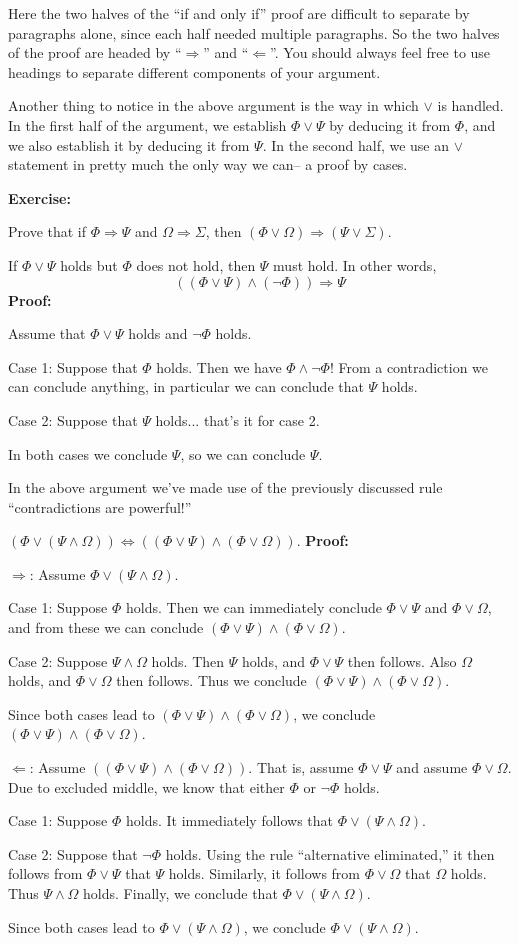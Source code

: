 \documentclass[12pt]{article}
\newcommand{\AND}{\wedge}
\newcommand{\OR}{\vee}
\newcommand{\ARR}{\Rightarrow}
\newcommand{\DARR}{\Leftrightarrow}
\newcommand{\ex}[1]{\textbf{Exercise:}\begin{adjustwidth}{2em}{}#1\end{adjustwidth}}
\newcommand{\DRULEPF}[3]{\begin{tcolorbox}[title=Derived Rule: #1,colbacktitle=white,coltitle=black,colback=white] {#2} \tcblower \textbf{Proof:} {#3} \end{tcolorbox}}
\def\pA{\Phi}
\def\pB{\Psi}
\def\pC{\Omega}
\def\pD{\Sigma}
\begin{document}
Here the two halves of the ``if and only if'' proof are difficult to separate by paragraphs alone, since each half needed multiple paragraphs.
So the two halves of the proof are headed by ``$\Rightarrow$'' and ``$\Leftarrow$''.
You should always feel free to use headings to separate different components of your argument.

Another thing to notice in the above argument is the way in which $\OR$ is handled.
In the first half of the argument, we establish $\pA\OR\pB$ by deducing it from $\pA$, and we also establish it by deducing it from $\pB$.
In the second half, we use an $\OR$ statement in pretty much the only way we can-- a proof by cases.

\ex{Prove that if $\pA\ARR\pB$ and $\pC\ARR\pD$, then $(\pA\OR\pC)\ARR(\pB\OR\pD)$.}

\DRULEPF{Alternative Eliminated}{
If $\pA\OR\pB$ holds but $\pA$ does not hold, then $\pB$ must hold.
In other words,
$$((\pA\OR\pB)\AND(\neg\pA))\ARR\pB$$
}{
Assume that $\pA\OR\pB$ holds and $\neg\pA$ holds.
\lsp

Case 1: Suppose that $\pA$ holds.
Then we have $\pA\AND\neg\pA$! From a contradiction we can conclude anything, in particular we can conclude that $\pB$ holds.
\lsp

Case 2: Suppose that $\pB$ holds... that's it for case 2.
\lsp

In both cases we conclude $\pB$, so we can conclude $\pB$.
}

In the above argument we've made use of the previously discussed rule ``contradictions are powerful!''


\DRULEPF{Or Distributes over And}{
$(\pA\OR(\pB\AND\pC))\DARR((\pA\OR\pB)\AND(\pA\OR\pC))$.
}{
$\Rightarrow$:
Assume $\pA\OR(\pB\AND\pC)$.
\lsp

Case 1: Suppose $\pA$ holds. Then we can immediately conclude $\pA\OR\pB$ and $\pA\OR\pC$, and from these
we can conclude $(\pA\OR\pB)\AND(\pA\OR\pC)$.
\lsp

Case 2: Suppose $\pB\AND\pC$ holds.
Then $\pB$ holds, and $\pA\OR\pB$ then follows.
Also $\pC$ holds, and $\pA\OR\pC$ then follows.
Thus we conclude $(\pA\OR\pB)\AND(\pA\OR\pC)$.
\lsp

Since both cases lead to $(\pA\OR\pB)\AND(\pA\OR\pC)$, we conclude $(\pA\OR\pB)\AND(\pA\OR\pC)$.
\lsp

$\Leftarrow$: Assume $((\pA\OR\pB)\AND(\pA\OR\pC))$.
That is, assume $\pA\OR\pB$ and assume $\pA\OR\pC$.
Due to excluded middle, we know that either $\pA$ or $\neg\pA$ holds.
\lsp

Case 1: Suppose $\pA$ holds. It immediately follows that $\pA\OR(\pB\AND\pC)$.
\lsp

Case 2: Suppose that $\neg\pA$ holds. Using the rule ``alternative eliminated,''
it then follows from $\pA\OR\pB$ that $\pB$ holds.
Similarly, it follows from $\pA\OR\pC$ that $\pC$ holds. Thus $\pB\AND\pC$ holds.
Finally, we conclude that $\pA\OR(\pB\AND\pC)$.
\lsp

Since both cases lead to $\pA\OR(\pB\AND\pC)$, we conclude $\pA\OR(\pB\AND\pC)$.
}
\end{document}
